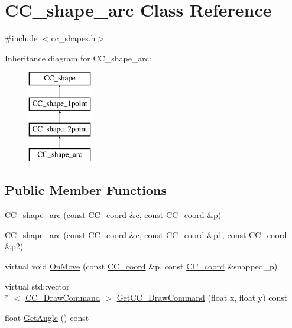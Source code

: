\hypertarget{a00041}{\section{C\-C\-\_\-shape\-\_\-arc Class Reference}
\label{a00041}
}


{\ttfamily \#include $<$cc\-\_\-shapes.\-h$>$}

Inheritance diagram for C\-C\-\_\-shape\-\_\-arc\-:\begin{figure}[H]
\begin{center}
\leavevmode
\includegraphics[height=4.000000cm]{a00041}
\end{center}
\end{figure}
\subsection*{Public Member Functions}
\begin{DoxyCompactItemize}
\item 
\hyperlink{a00041_a7ada4ea48bdb57dd83bca69412b8d65b}{C\-C\-\_\-shape\-\_\-arc} (const \hyperlink{a00029}{C\-C\-\_\-coord} \&c, const \hyperlink{a00029}{C\-C\-\_\-coord} \&p)
\item 
\hyperlink{a00041_a14e6776d9618db1f82e6214b6801a04e}{C\-C\-\_\-shape\-\_\-arc} (const \hyperlink{a00029}{C\-C\-\_\-coord} \&c, const \hyperlink{a00029}{C\-C\-\_\-coord} \&p1, const \hyperlink{a00029}{C\-C\-\_\-coord} \&p2)
\item 
virtual void \hyperlink{a00041_ac99e4b812a5eb489d29d324cd7dca7e5}{On\-Move} (const \hyperlink{a00029}{C\-C\-\_\-coord} \&p, const \hyperlink{a00029}{C\-C\-\_\-coord} \&snapped\-\_\-p)
\item 
virtual std\-::vector\\*
$<$ \hyperlink{a00031}{C\-C\-\_\-\-Draw\-Command} $>$ \hyperlink{a00041_aa8f4623a8093d5fb095912e2b13ccf80}{Get\-C\-C\-\_\-\-Draw\-Command} (float x, float y) const 
\item 
float \hyperlink{a00041_a822ebc83a7e441cb1b710f6599aad92b}{Get\-Angle} () const 
\end{DoxyCompactItemize}
